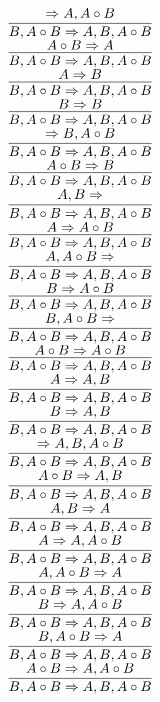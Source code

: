 \documentclass[11pt]{article}
\begin{document}
\begin{center}
\bigskip
\\$\infer{B, A\circ B\Rightarrow A, B, A\circ B}{\Rightarrow A, A\circ B}$
\bigskip
\\$\infer{B, A\circ B\Rightarrow A, B, A\circ B}{A\circ B\Rightarrow A}$
\bigskip
\\$\infer{B, A\circ B\Rightarrow A, B, A\circ B}{A\Rightarrow B}$
\bigskip
\\$\infer{B, A\circ B\Rightarrow A, B, A\circ B}{B\Rightarrow B}$
\bigskip
\\$\infer{B, A\circ B\Rightarrow A, B, A\circ B}{\Rightarrow B, A\circ B}$
\bigskip
\\$\infer{B, A\circ B\Rightarrow A, B, A\circ B}{A\circ B\Rightarrow B}$
\bigskip
\\$\infer{B, A\circ B\Rightarrow A, B, A\circ B}{A, B\Rightarrow }$
\bigskip
\\$\infer{B, A\circ B\Rightarrow A, B, A\circ B}{A\Rightarrow A\circ B}$
\bigskip
\\$\infer{B, A\circ B\Rightarrow A, B, A\circ B}{A, A\circ B\Rightarrow }$
\bigskip
\\$\infer{B, A\circ B\Rightarrow A, B, A\circ B}{B\Rightarrow A\circ B}$
\bigskip
\\$\infer{B, A\circ B\Rightarrow A, B, A\circ B}{B, A\circ B\Rightarrow }$
\bigskip
\\$\infer{B, A\circ B\Rightarrow A, B, A\circ B}{A\circ B\Rightarrow A\circ B}$
\bigskip
\\$\infer{B, A\circ B\Rightarrow A, B, A\circ B}{A\Rightarrow A, B}$
\bigskip
\\$\infer{B, A\circ B\Rightarrow A, B, A\circ B}{B\Rightarrow A, B}$
\bigskip
\\$\infer{B, A\circ B\Rightarrow A, B, A\circ B}{\Rightarrow A, B, A\circ B}$
\bigskip
\\$\infer{B, A\circ B\Rightarrow A, B, A\circ B}{A\circ B\Rightarrow A, B}$
\bigskip
\\$\infer{B, A\circ B\Rightarrow A, B, A\circ B}{A, B\Rightarrow A}$
\bigskip
\\$\infer{B, A\circ B\Rightarrow A, B, A\circ B}{A\Rightarrow A, A\circ B}$
\bigskip
\\$\infer{B, A\circ B\Rightarrow A, B, A\circ B}{A, A\circ B\Rightarrow A}$
\bigskip
\\$\infer{B, A\circ B\Rightarrow A, B, A\circ B}{B\Rightarrow A, A\circ B}$
\bigskip
\\$\infer{B, A\circ B\Rightarrow A, B, A\circ B}{B, A\circ B\Rightarrow A}$
\bigskip
\\$\infer{B, A\circ B\Rightarrow A, B, A\circ B}{A\circ B\Rightarrow A, A\circ B}$

\end{center}
\end{document}
